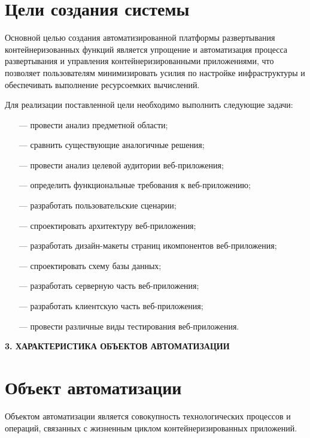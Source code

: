 \section{Цели создания системы}

Основной целью создания автоматизированной платформы развертывания контейнеризованных функций является упрощение и автоматизация процесса развертывания и управления контейнеризированными приложениями, что позволяет пользователям минимизировать усилия по настройке инфраструктуры и обеспечивать выполнение ресурсоемких вычислений.

Для реализации поставленной цели необходимо выполнить следующие задачи:

\begin{itemize}
\item[---]провести анализ предметной области;
\item[---]сравнить существующие аналогичные решения;
\item[---]провести анализ целевой аудитории веб-приложения;
\item[---]определить функциональные требования к веб-приложению;
\item[---]разработать пользовательские сценарии;
\item[---]спроектировать архитектуру веб-приложения;
\item[---]разработать дизайн-макеты страниц икомпонентов веб-приложения;
\item[---]спроектировать схему базы данных;
\item[---]разработать серверную часть веб-приложения;
\item[---]разработать клиентскую часть веб-приложения;
\item[---]провести различные виды тестирования веб-приложения.
\end{itemize}

\newpage
\begin{center}
  \textbf{\large 3. ХАРАКТЕРИСТИКА ОБЪЕКТОВ АВТОМАТИЗАЦИИ}
\end{center}

\section{Объект автоматизации}

Объектом автоматизации является совокупность технологических процессов и операций, связанных с жизненным циклом контейнеризированных приложений.

